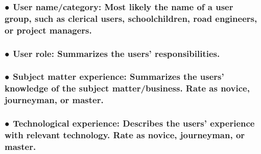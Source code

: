 \documentclass[
]{article}
\begin{document}
\hypertarget{user-namecategory-most-likely-the-name-of-a-user-group-such-as-clerical-users-schoolchildren-road-engineers-or-project-managers.}{%
\subsubsection{● User name/category: Most likely the name of a user
group, such as clerical users, schoolchildren, road engineers, or
project
managers.}\label{user-namecategory-most-likely-the-name-of-a-user-group-such-as-clerical-users-schoolchildren-road-engineers-or-project-managers.}}

\hypertarget{user-role-summarizes-the-users-responsibilities.}{%
\subsubsection{\texorpdfstring{● User role: Summarizes the users'
responsibilities.
}{● User role: Summarizes the users' responsibilities. }}\label{user-role-summarizes-the-users-responsibilities.}}

\hypertarget{subject-matter-experience-summarizes-the-users-knowledge-of-the-subject-matterbusiness.-rate-as-novice-journeyman-or-master.}{%
\subsubsection{\texorpdfstring{● Subject matter experience: Summarizes
the users' knowledge of the subject matter/business. Rate as novice,
journeyman, or master.
}{● Subject matter experience: Summarizes the users' knowledge of the subject matter/business. Rate as novice, journeyman, or master. }}\label{subject-matter-experience-summarizes-the-users-knowledge-of-the-subject-matterbusiness.-rate-as-novice-journeyman-or-master.}}

\hypertarget{technological-experience-describes-the-users-experience-with-relevant-technology.-rate-as-novice-journeyman-or-master.}{%
\subsubsection{\texorpdfstring{● Technological experience: Describes the
users' experience with relevant technology. Rate as novice, journeyman,
or master.
}{● Technological experience: Describes the users' experience with relevant technology. Rate as novice, journeyman, or master. }}\label{technological-experience-describes-the-users-experience-with-relevant-technology.-rate-as-novice-journeyman-or-master.}}
\end{document}
